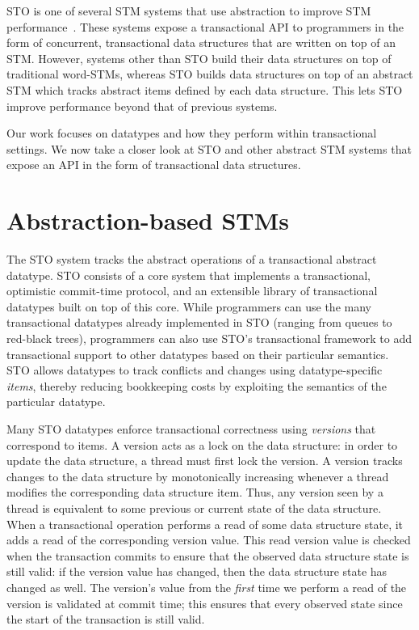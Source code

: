 STO is one of several STM systems that use abstraction to improve STM performance~\cite{predication,autolock, optboost, boost}. These systems expose a transactional API to programmers in the form of concurrent, transactional data structures that are written on top of an STM. However, systems other than STO build their data structures on top of traditional word-STMs, whereas STO builds data structures on top of an abstract STM which tracks abstract items defined by each data structure. This lets STO improve performance beyond that of previous systems. 

Our work focuses on datatypes and how they perform within transactional settings. We now take a closer look at STO and other abstract STM systems that expose an API in the form of transactional data structures.

\section{Abstraction-based STMs}

The STO system tracks the abstract operations of a transactional abstract datatype. STO consists of a core system that implements a transactional, optimistic commit-time protocol, and an extensible library of transactional datatypes built on top of this core. While programmers can use the many transactional datatypes already implemented in STO (ranging from queues to red-black trees), programmers can also use STO's transactional framework to add transactional support to other datatypes based on their particular semantics. STO allows datatypes to track conflicts and changes using datatype-specific \emph{items}, thereby reducing bookkeeping costs by exploiting the semantics of the particular datatype. 

Many STO datatypes enforce transactional correctness using \emph{versions} that correspond to items. A version acts as a lock on the data structure: in order to update the data structure, a thread must first lock the version. A version tracks changes to the data structure by monotonically increasing whenever a thread modifies the corresponding data structure item. Thus, any version seen by a thread is equivalent to some previous or current state of the data structure. When a transactional operation performs a read of some data structure state, it adds a read of the corresponding version value. This read version value is checked when the transaction commits to ensure that the observed data structure state is still valid: if the version value has changed, then the data structure state has changed as well.
The version's value from the \emph{first} time we perform a read of the version is validated at commit time; this ensures that every observed state since the start of the transaction is still valid.

